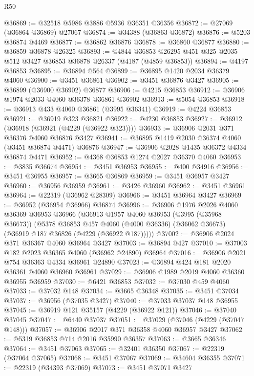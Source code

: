 \begin{lexlean}{R50}
\begin{coremodule}
@36869 := @32518 @5986 @3886 @5936 @36351 @36356
@36872 := @27069 (@36864 @36869) @27067
@36874 := @34388 (@36863 @36872)
@36876 := @5203 @36874 @4469
@36877 := @36862 @36876
@36878 := @36860 @36877
@36880 := @36859 @36878 @26325
@36893 := @4844 @36853 @26295 @451 @325 @2035 @512 @3427 @36853 @36878 @26337 (@4187 (@4859 @36853))
@36894 := @4197 @36853
@36895 := @36894 @564
@36899 := @36895 @1420 @2034 @36379 @4060
@36900 := @3451 @36861
@36902 := @3451 @36876 @3427
@36905 := @36899 (@36900 @36902) @36877
@36906 := @4215 @36853
@36912 := @36906 @1974 @2033 @4060 @36378 @36861 @36902
@36913 := @5054 @36853
@36918 := @36913 @433 @4060 @36861 (@3995 @36341)
@36919 := @4224 @36853
@36921 := @36919 @323 @36821
@36922 := @4230 @36853
@36927 := @36912 (@36918 (@36921 (@4229 (@36922 @323))))
@36933 := @36906 @2031 @371 @36376 @4060 @36876 @3427
@36941 := @36895 @1419 @2030 @36374 @4060 (@3451 @36874 @4471) @36876
@36947 := @36906 @2028 @1435 @36372 @4334 @36874 @4471
@36952 := @4368 @36853 @1274 @2027 @36370 @4060
@36953 := @3835 @36674
@36954 := @3451 @36953
@36955 := @400 @34916
@36956 := @3451 @36955
@36957 := @3665 @36869
@36959 := @3451 @36957 @3427
@36960 := @36956 @36959
@36961 := @3426 @36960
@36962 := @3451 @36961
@36964 := @22319 (@36962 @28309)
@36966 := @3451 @36964 @3427
@36969 := @36952 (@36954 @36966) @36874
@36996 := @36906
    @1976
    @2026
    @4060
    @36369
    @36953
    @36966
    (@36913
      @1957
      @4060
      @36953
      (@3995 (@35968 @36673))
      (@5378
        @36853
        @457
        @4060
        (@4000 @36336)
        (@36062 @36673)
        (@36919 @187 @36826 (@4229 (@36922 @187)))))
@37002 := @36906 @2024 @371 @36367 @4060 @36964 @3427
@37003 := @36894 @427
@37010 := @37003 @182 @2023 @36365 @4060 (@36962 @24890) @36964
@37016 := @36906 @2021 @754 @36363 @4334 @36961 @24890
@37023 := @36894 @424 @181 @2020 @36361 @4060 @36960 @36961
@37029 := @36906 @1989 @2019 @4060 @36360 @36955 @36959
@37030 := @6421 @36853
@37032 := @37030 @459 @4060
@37033 := @37032 @148
@37034 := @3665 @36348
@37035 := @3451 @37034
@37037 := @36956 (@37035 @3427)
@37040 := @37033 @37037 @148 @36955
@37045 := @36919 @121 @35157 (@4229 (@36922 @121))
@37046 := @37040 @37045
@37047 := @6440 @37037
@37051 := @37029 (@37046 (@4229 (@37047 @148)))
@37057 := @36906 @2017 @371 @36358 @4060 @36957 @3427
@37062 := @5319 @36853 @714 @2016 @35990 @36357
@37063 := @3665 @36346
@37064 := @3451 @37063
@37065 := @32401 @36350
@37067 := @22319 (@37064 @37065)
@37068 := @3451 @37067
@37069 := @34604 @36355
@37071 := @22319 (@34393 @37069)
@37073 := @3451 @37071 @3427

\end{coremodule}
\end{lexlean}

